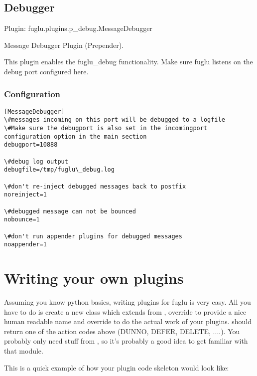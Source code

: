 \documentclass[letterpaper,10pt,english]{sphinxmanual}
\begin{document}
\subsection{Debugger}
\label{plugins-index:debugger}
Plugin: fuglu.plugins.p\_debug.MessageDebugger

Message Debugger Plugin (Prepender).

This plugin enables the fuglu\_debug functionality. Make sure fuglu listens on the debug port configured here.


\subsubsection{Configuration}
\label{plugins-index:id12}
\begin{Verbatim}[commandchars=\\\{\}]
[MessageDebugger]
\#messages incoming on this port will be debugged to a logfile
\#Make sure the debugport is also set in the incomingport configuration option in the main section
debugport=10888

\#debug log output
debugfile=/tmp/fuglu\_debug.log

\#don't re-inject debugged messages back to postfix
noreinject=1

\#debugged message can not be bounced
nobounce=1

\#don't run appender plugins for debugged messages
noappender=1
\end{Verbatim}


\section{Writing your own plugins}
\label{plugins-index:writing-your-own-plugins}
Assuming you know python basics, writing plugins for fuglu is very easy. All you have to do is create a new class which extends from , override  to provide a nice human readable name and override  to do the actual work of your plugins.  should return one of the action codes above (DUNNO, DEFER, DELETE, ....). You probably only need stuff from , so it's probably a good idea to get familiar with that module.

This is a quick example of how your plugin code skeleton would look like:
\end{document}
